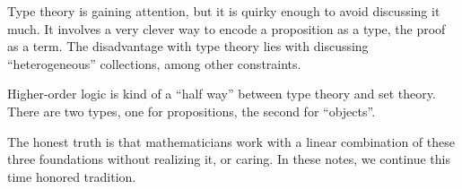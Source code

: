 Type theory is gaining attention, but it is quirky enough to avoid
discussing it much. It involves a very clever way to encode a
proposition as a type, the proof as a term. The disadvantage with type
theory lies with discussing ``heterogeneous'' collections, among other
constraints.

Higher-order logic is kind of a ``half way'' between type theory and set
theory. There are two types, one for propositions, the second for
``objects''.

The honest truth is that mathematicians work with a linear combination
of these three foundations without realizing it, or caring. In these
notes, we continue this time honored tradition.